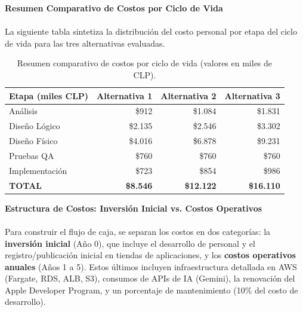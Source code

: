 \documentclass[12pt]{article}
\begin{document}
\newpage
\textbf{Resumen Comparativo de Costos por Ciclo de Vida}
\\\\
La siguiente tabla sintetiza la distribución del costo personal por etapa del ciclo de vida para las tres alternativas evaluadas.
\begin{table}[h!]
    \centering
    \renewcommand{\arraystretch}{1.4}
    \footnotesize
    \begin{tabular}{|m{2.8cm}|r|r|r|}
        \hline
        \rowcolor[HTML]{EFEFEF}
        \textbf{Etapa (miles CLP)} & \textbf{Alternativa 1} & \textbf{Alternativa 2} & \textbf{Alternativa 3} \\ \hline
        Análisis & \$912 & \$1.084& \$1.831 \\ \hline
        Diseño Lógico & \$2.135 & \$2.546 & \$3.302 \\ \hline
        Diseño Físico & \$4.016 & \$6.878 & \$9.231 \\ \hline
        Pruebas QA & \$760 & \$760 & \$760 \\ \hline
        Implementación & \$723 & \$854 & \$986 \\ \hline
        \rowcolor[HTML]{E8F5E9}
        \textbf{TOTAL} & \textbf{\$8.546} & \textbf{\$12.122} & \textbf{\$16.110} \\ \hline
    \end{tabular}
    \caption{Resumen comparativo de costos por ciclo de vida (valores en miles de CLP).}
    \label{tab:resumen_ciclovida}
\end{table}

\newpage
\textbf{Estructura de Costos: Inversión Inicial vs. Costos Operativos}
\\\\
Para construir el flujo de caja, se separan los costos en dos categorías: la \textbf{inversión inicial} (Año 0), que incluye el desarrollo de personal y el registro/publicación inicial en tiendas de aplicaciones, y los \textbf{costos operativos anuales} (Años 1 a 5). Estos últimos incluyen infraestructura detallada en AWS (Fargate, RDS, ALB, S3), consumos de APIs de IA (Gemini), la renovación del Apple Developer Program, y un porcentaje de mantenimiento (10\% del costo de desarrollo).
\end{document}
